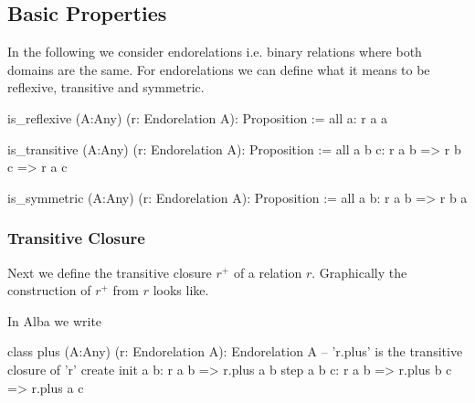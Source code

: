 \subsection{Basic Properties}


In the following we consider endorelations i.e. binary relations where both
domains are the same. For endorelations we can define what it means to be
reflexive, transitive and symmetric.

\begin{alba}
  is_reflexive (A:Any) (r: Endorelation A): Proposition :=
    all a: r a a

  is_transitive (A:Any) (r: Endorelation A): Proposition :=
    all a b c: r a b => r b c => r a c

  is_symmetric (A:Any) (r: Endorelation A): Proposition :=
    all a b: r a b => r b a
\end{alba}



\subsubsection{Transitive Closure}

Next we define the transitive closure $r^+$ of a relation $r$. Graphically the
construction of $r^+$ from $r$ looks like.



In Alba we write

\begin{alba}
    class
        plus (A:Any) (r: Endorelation A): Endorelation A
            -- 'r.plus' is the transitive closure of 'r'
    create
        init a b:
            r a b
            => r.plus a b
        step a b c:
            r a b
            => r.plus b c
            => r.plus a c
\end{alba}

